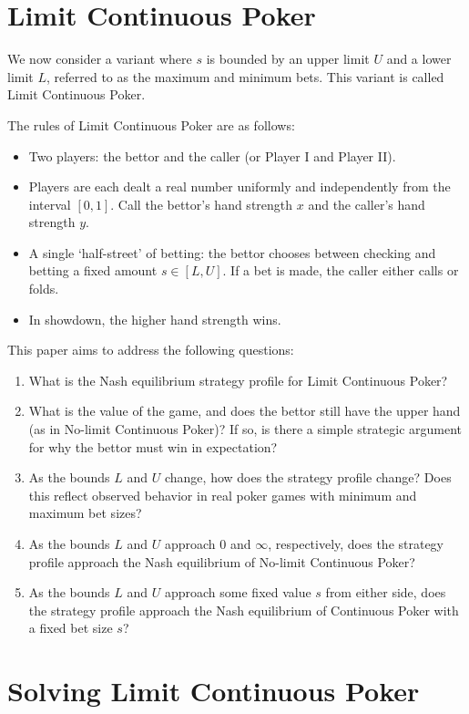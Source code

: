 \documentclass[a4paper,12pt]{article}
\begin{document}
\section{Limit Continuous Poker}
We now consider a variant where $s$ is bounded by an upper limit $U$ and a lower limit $L$, referred to as the maximum and minimum bets. This variant is called Limit Continuous Poker.

The rules of Limit Continuous Poker are as follows:
\begin{itemize}
    \item Two players: the bettor and the caller (or Player I and Player II).
    \item Players are each dealt a real number uniformly and independently from the interval $[0, 1]$. Call the bettor's hand strength $x$ and the caller's hand strength $y$.
    \item A single `half-street' of betting: the bettor chooses between checking and betting a fixed amount $s \in [L, U]$. If a bet is made, the caller either calls or folds.
    \item In showdown, the higher hand strength wins.
\end{itemize}

This paper aims to address the following questions:
\begin{enumerate}
    \item What is the Nash equilibrium strategy profile for Limit Continuous Poker?
    \item What is the value of the game, and does the bettor still have the upper hand (as in No-limit Continuous Poker)? If so, is there a simple strategic argument for why the bettor must win in expectation?
    \item As the bounds $L$ and $U$ change, how does the strategy profile change? Does this reflect observed behavior in real poker games with minimum and maximum bet sizes?
    \item As the bounds $L$ and $U$ approach $0$ and $\infty$, respectively, does the strategy profile approach the Nash equilibrium of No-limit Continuous Poker?
    \item As the bounds $L$ and $U$ approach some fixed value $s$ from either side, does the strategy profile approach the Nash equilibrium of Continuous Poker with a fixed bet size $s$?
\end{enumerate}

\section{Solving Limit Continuous Poker}
\end{document}
